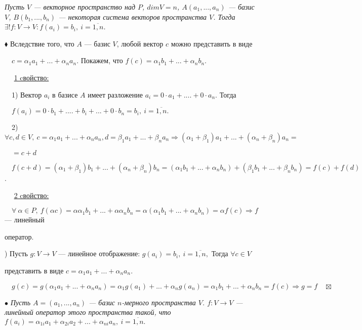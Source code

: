 \documentclass[a4paper, 12pt]{report}
\begin{document}
	\textit{Пусть $V$ --- векторное пространство над $P$, $dim V = n$, $A(a_1,...,a_n)$ --- базис $V$, $B(b_1,...,b_n)$ --- некоторая система векторов пространства $V$. Тогда $\exists! f:V\rightarrow V : f(a_i) = b_i, \ i = \overline{1,n}$.}
	\par\bigskip
	$\blacklozenge$ Вследствие того, что $A$ --- базис $V$, любой вектор $c$ можно представить в виде 
	
	$\quad c = \alpha_1a_1 + ... + \alpha_n a_n$. Покажем, что $f(c) = \alpha_1 b_1 + ... + \alpha_n b_n$.
	\par\bigskip
	$\quad$ \underline{1 cвойство:}
	
	$\quad$1) Вектор $a_i$ в базисе $A$ имеет разложение $a_i = 0\cdot a_1 + .... + 0\cdot a_n$. Тогда
	
	$\quad f(a_i) = 0\cdot b_1 + .... + b_i + ... + 0\cdot b_n = b_i,\ i = \overline{1,n}.$
	
	$\quad$2) $\forall c, d \in V,\ c = \alpha_1 a_1 + ... + \alpha_n a_n, d = \beta_1 a_1 + ... + \beta_n a_n \Rightarrow (\alpha_1 + \beta_1) a_1 + ... + (\alpha_n + \beta_n) a_n =$
	
	$\quad = c+d$
	
	$\quad f(c+d) = (\alpha_1 + \beta_1) b_1 + ... + (\alpha_n + \beta_n) b_n = (\alpha_1 b_1 + ... + \alpha_n b_n) + (\beta_1 b_1 + ... + \beta_n b_n) = f(c) + f(d)$.
	\par\bigskip
	$\quad$ \underline{2 cвойство:}
	
	$\quad \forall\ \alpha \in P,\ f(\alpha c) = \alpha \alpha_1 b_1 + ... + \alpha \alpha_n b_n = \alpha(\alpha_1 b_1 + ... + \alpha_n b_n) = \alpha f(c) \Rightarrow f$ --- линейный 
	\par
	\quad оператор.
	\par{}) Пусть $g:V\rightarrow V$ --- линейное отображение: $g(a_i) = b_i,\ i = \overline{1,n},$ Тогда $\forall c \in V$ 
	
	 представить в виде $c = \alpha_1 a_1 + ... + \alpha_n a_n$.
	
	$\quad g(c) = g(\alpha_1 a_1 + ... + \alpha_n a_n) = \alpha_1 g(a_1) + ... + \alpha_n g(a_n) = \alpha_1 b_1 + ... + \alpha_n b_n = f(c) \Rightarrow g = f \quad \boxtimes$
	\par\bigskip
	\textit{$\bullet$ Пусть $A = (a_1,...,a_n)$ --- базис $n$-мерного пространства $V$. $f:V\rightarrow V$ --- линейный оператор этого пространства такой, что $f(a_i) = \alpha_{1i} a_1 + \alpha_{2i} a_2 + ... + \alpha_{ni} a_n,\ i = \overline{1,n}.$}
	
\end{document}
